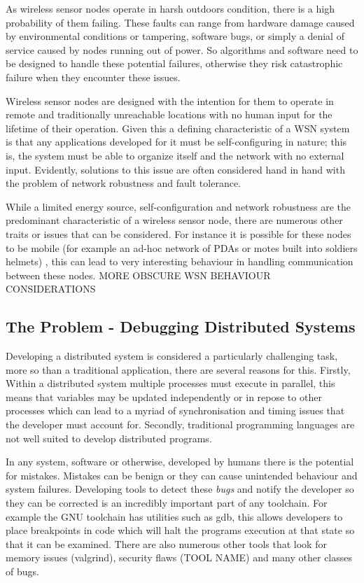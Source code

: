 As wireless sensor nodes operate in harsh outdoors condition\cite{SzewczykPMC04, Werner-Allen:2006:FYV:1298455.1298491}, there is a high probability of them failing. These faults can range from hardware damage caused by environmental conditions or tampering, software bugs, or simply a denial of service caused by nodes running out of power. So algorithms and software need to be designed to handle these potential failures, otherwise they risk catastrophic failure when they encounter these issues.

Wireless sensor nodes are designed with the intention for them to operate in remote and traditionally unreachable locations with no human input for the lifetime of their operation\cite{1437066}. Given this a defining characteristic of a WSN system is that any applications developed for it must be self-configuring in nature; this is, the system must be able to organize itself and the network with no external input\cite{?}. Evidently, solutions to this issue are often considered hand in hand with the problem of network robustness and fault tolerance.   

While a limited energy source, self-configuration and network robustness are the predominant characteristic of a wireless sensor node, there are numerous other traits or issues that can be considered. For instance it is possible for these nodes to be mobile (for example an ad-hoc network of PDAs or motes built into soldiers helmets) \cite{4224091}, this can lead to very interesting behaviour in handling communication between these nodes. MORE OBSCURE WSN BEHAVIOUR CONSIDERATIONS

\subsection{The Problem - Debugging Distributed Systems}

Developing a distributed system is considered a particularly challenging task, more so than a traditional application, there are several reasons for this. Firstly, Within a distributed system multiple processes must execute in parallel, this means that variables may be updated independently or in repose to other processes which can lead to a myriad of synchronisation and timing issues that the developer must account for. Secondly, traditional programming languages are not well suited to develop distributed programs\cite{93692,345131}.

In any system, software or otherwise, developed by humans there is the potential for mistakes. Mistakes can be benign or they can cause unintended behaviour and system failures. Developing tools to detect these \emph{bugs} and notify the developer so they can be corrected is an incredibly important part of any toolchain. For example the GNU toolchain has utilities such as gdb\cite{?}, this allows developers to place breakpoints in code which will halt the programs execution at that state so that it can be examined. There are also numerous other tools that look for memory issues (valgrind\cite{?}), security flaws (TOOL NAME\cite{?}) and many other classes of bugs.

